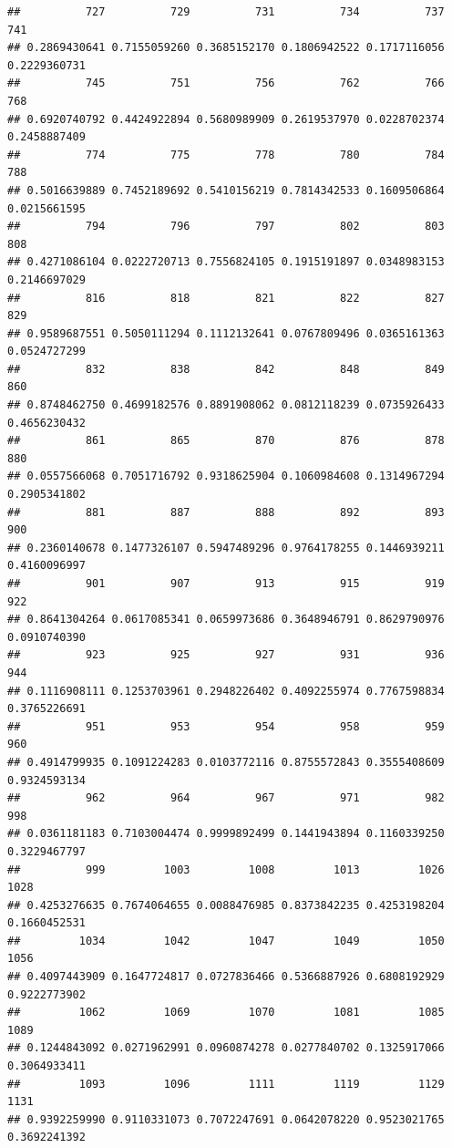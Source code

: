 \documentclass[
]{article}
\begin{document}
\begin{verbatim}
##          727          729          731          734          737          741 
## 0.2869430641 0.7155059260 0.3685152170 0.1806942522 0.1717116056 0.2229360731 
##          745          751          756          762          766          768 
## 0.6920740792 0.4424922894 0.5680989909 0.2619537970 0.0228702374 0.2458887409 
##          774          775          778          780          784          788 
## 0.5016639889 0.7452189692 0.5410156219 0.7814342533 0.1609506864 0.0215661595 
##          794          796          797          802          803          808 
## 0.4271086104 0.0222720713 0.7556824105 0.1915191897 0.0348983153 0.2146697029 
##          816          818          821          822          827          829 
## 0.9589687551 0.5050111294 0.1112132641 0.0767809496 0.0365161363 0.0524727299 
##          832          838          842          848          849          860 
## 0.8748462750 0.4699182576 0.8891908062 0.0812118239 0.0735926433 0.4656230432 
##          861          865          870          876          878          880 
## 0.0557566068 0.7051716792 0.9318625904 0.1060984608 0.1314967294 0.2905341802 
##          881          887          888          892          893          900 
## 0.2360140678 0.1477326107 0.5947489296 0.9764178255 0.1446939211 0.4160096997 
##          901          907          913          915          919          922 
## 0.8641304264 0.0617085341 0.0659973686 0.3648946791 0.8629790976 0.0910740390 
##          923          925          927          931          936          944 
## 0.1116908111 0.1253703961 0.2948226402 0.4092255974 0.7767598834 0.3765226691 
##          951          953          954          958          959          960 
## 0.4914799935 0.1091224283 0.0103772116 0.8755572843 0.3555408609 0.9324593134 
##          962          964          967          971          982          998 
## 0.0361181183 0.7103004474 0.9999892499 0.1441943894 0.1160339250 0.3229467797 
##          999         1003         1008         1013         1026         1028 
## 0.4253276635 0.7674064655 0.0088476985 0.8373842235 0.4253198204 0.1660452531 
##         1034         1042         1047         1049         1050         1056 
## 0.4097443909 0.1647724817 0.0727836466 0.5366887926 0.6808192929 0.9222773902 
##         1062         1069         1070         1081         1085         1089 
## 0.1244843092 0.0271962991 0.0960874278 0.0277840702 0.1325917066 0.3064933411 
##         1093         1096         1111         1119         1129         1131 
## 0.9392259990 0.9110331073 0.7072247691 0.0642078220 0.9523021765 0.3692241392 

\end{verbatim}
\end{document}
